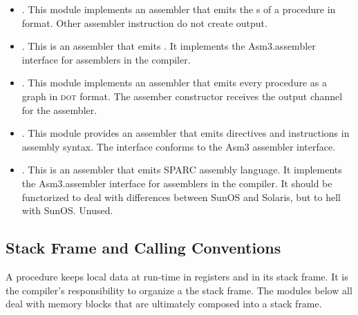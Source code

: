 \documentclass{article}%
\begin{document}
\begin{itemize} 

\item {}. This module implements
an assembler that emits the {\rtl}s of a procedure in {\asdl} format.
Other assembler instruction do not create output.

\item {}. This is an assembler that emits {\PAL}. It
implements the {\Tt{}Asm3.assembler\nwendquote} interface for assemblers in the {\qcc}
compiler.

\item {}. This module implements an assembler that
emits every procedure as a graph in \textsc{dot} format. The assember
constructor receives the output channel for the assembler.

\item {}. This module provides an assembler that
emits directives and instructions in {\sparc} assembly syntax. The
interface conforms to the {\Tt{}Asm3\nwendquote} assembler interface.

\item {}. This is an assembler that emits SPARC
assembly language.  It implements the {\Tt{}Asm3.assembler\nwendquote} interface for
assemblers in the {\qcc} compiler.  It should be functorized to deal
with differences between SunOS and Solaris, but to hell with SunOS.
Unused.

\end{itemize}

\subsection{Stack Frame and Calling Conventions}

A procedure keeps local data at run-time in registers and in its stack
frame. It is the compiler's responsibility to organize a the stack
frame. The modules below all deal with memory blocks that are ultimately
composed into a stack frame.
\end{document}
